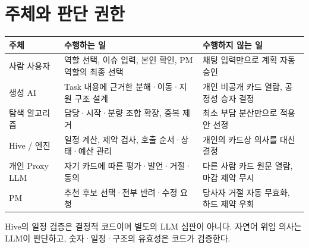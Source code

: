 \documentclass[11pt,a4paper]{article}
\begin{document}
\section{주체와 판단 권한}
\begin{tabularx}{\linewidth}{@{}p{27mm}YY@{}}\toprule
주체 & 수행하는 일 & 수행하지 않는 일\\\midrule
사람 사용자 & 역할 선택, 이슈 입력, 본인 확인, PM 역할의 최종 선택 & 채팅 입력만으로 계획 자동 승인\\
생성 AI & Task 내용에 근거한 분해·이동·지원 구조 설계 & 개인 비공개 카드 열람, 공정성 승자 결정\\
탐색 알고리즘 & 담당·시작·분량 조합 확장, 중복 제거 & 최소 부담 분산만으로 적용안 선정\\
Hive / 엔진 & 일정 계산, 제약 검사, 호출 순서·상태·예산 관리 & 개인의 카드상 의사를 대신 결정\\
개인 Proxy LLM & 자기 카드에 따른 평가·발언·거절·동의 & 다른 사람 카드 원문 열람, 마감 제약 무시\\
PM & 추천 후보 선택·전부 반려·수정 요청 & 당사자 거절 자동 무효화, 하드 제약 우회\\\bottomrule
\end{tabularx}

Hive의 일정 검증은 결정적 코드이며 별도의 LLM 심판이 아니다. 자연어 위임 의사는 LLM이 판단하고, 숫자·일정·구조의 유효성은 코드가 검증한다.

\newpage
\end{document}
